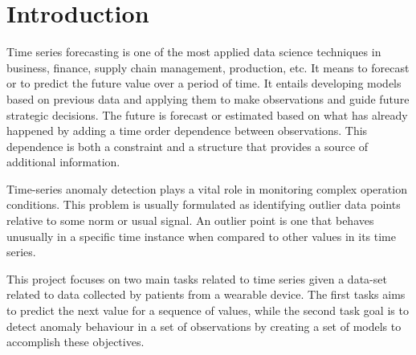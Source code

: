 \chapter*{Introduction}


Time series forecasting is one of the most applied data science techniques in business, finance, supply chain management, production, etc. It means to forecast or to predict the future value over a period of time. It entails developing models based on previous data and applying them to make observations and guide future strategic decisions. The future is forecast or estimated based on what has already happened by adding a time order dependence between observations. This dependence is both a constraint and a structure that provides a source of additional information.

Time-series anomaly detection plays a vital role in monitoring complex operation conditions. This problem is usually formulated as identifying outlier data points relative to some norm or usual signal. An outlier point is one that behaves unusually in a specific time instance when compared to other values in its time series. 

This project focuses on two main tasks related to time series given a data-set related to data collected by patients from a wearable device. The first tasks aims to predict the next value for a sequence of values, while the second task goal is to detect anomaly behaviour in a set of observations by creating a set of models to accomplish these objectives.


